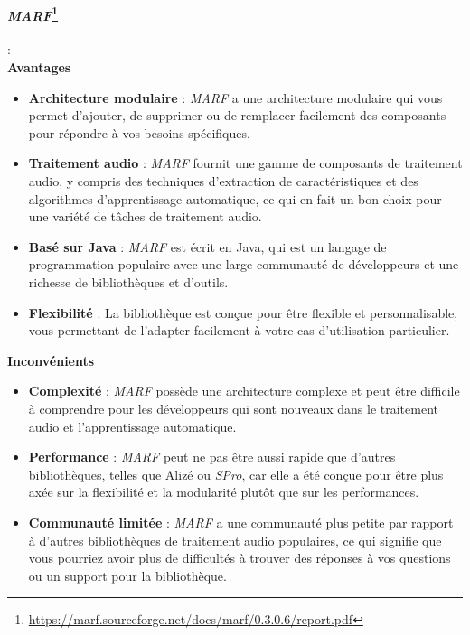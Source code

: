 \paragraph*{\textbf{\textit{MARF}}\footnote{\url{https://marf.sourceforge.net/docs/marf/0.3.0.6/report.pdf}}}:\\


\textbf{Avantages}
\begin{itemize}
      \item \textbf{Architecture modulaire} : \textit{MARF} a une architecture modulaire qui vous permet d'ajouter, de supprimer ou de remplacer facilement des composants
            pour répondre à vos besoins spécifiques.
      \item \textbf{Traitement audio} : \textit{MARF} fournit une gamme de composants de traitement audio, y compris des techniques d'extraction de caractéristiques et des
            algorithmes d'apprentissage automatique, ce qui en fait un bon choix pour une variété de tâches de traitement audio.
      \item \textbf{Basé sur Java} : \textit{MARF} est écrit en Java, qui est un langage de programmation populaire avec une large communauté de développeurs et une richesse
            de bibliothèques et d'outils.
      \item \textbf{Flexibilité} : La bibliothèque est conçue pour être flexible et personnalisable, vous permettant de l'adapter facilement à votre cas d'utilisation particulier.
\end{itemize}


\textbf{Inconvénients}
\begin{itemize}
      \item \textbf{Complexité} : \textit{MARF} possède une architecture complexe et peut être difficile à comprendre pour les développeurs qui sont nouveaux dans le traitement audio
            et l'apprentissage automatique.
      \item \textbf{Performance} : \textit{MARF} peut ne pas être aussi rapide que d'autres bibliothèques, telles que Alizé ou \textit{SPro}, car elle a été conçue pour être
            plus axée sur la flexibilité et la modularité plutôt que sur les performances.
      \item \textbf{Communauté limitée} : \textit{MARF} a une communauté plus petite par rapport à d'autres bibliothèques de traitement audio populaires, ce qui signifie que
            vous pourriez avoir plus de difficultés à trouver des réponses à vos questions ou un support pour la bibliothèque.
\end{itemize}
